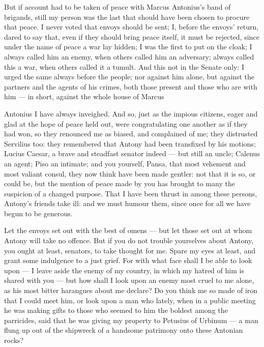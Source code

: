  But if account had to be taken of peace with Marcus Antonius's band of brigands, still my person was the last that should have been chosen to procure that peace. I never voted that envoys should be sent; I, before the envoys' return, dared to say that, even if they should bring peace itself, it must be rejected, since under the name of peace a war lay hidden; I was the first to put on the cloak; I always called him an enemy, when others called him an adversary; always called this a war, when others called it a tumult. And this not in the Senate only: I urged the same always before the people; nor against him alone, but against the partners and the agents of his crimes, both those present and those who are with him --- in short, against the whole house of Marcus

 Antonius I have always inveighed. And so, just as the impious citizens, eager and glad at the hope of peace held out, were congratulating one another as if they had won, so they renounced me as biased, and complained of me; they distrusted Servilius too: they remembered that Antony had been transfixed by his motions; Lucius Caesar, a brave and steadfast senator indeed --- but still an uncle; Calenus an agent; Piso an intimate; and you yourself, Pansa, that most vehement and most valiant consul, they now think have been made gentler: not that it is so, or could be, but the mention of peace made by you has brought to many the suspicion of a changed purpose. That I have been thrust in among these persons, Antony's friends take ill: and we must humour them, since once for all we have begun to be generous.

 Let the envoys set out with the best of omens --- but let those set out at whom Antony will take no offence. But if you do not trouble yourselves about Antony, you ought at least, senators, to take thought for me. Spare my eyes at least, and grant some indulgence to a just grief. For with what face shall I be able to look upon --- I leave aside the enemy of my country, in which my hatred of him is shared with you --- but how shall I look upon an enemy most cruel to me alone, as his most bitter harangues about me declare? Do you think me so made of iron that I could meet him, or look upon a man who lately, when in a public meeting he was making gifts to those who seemed to him the boldest among the parricides, said that he was giving my property to Petusius of Urbinum --- a man flung up out of the shipwreck of a handsome patrimony onto these Antonian rocks?


